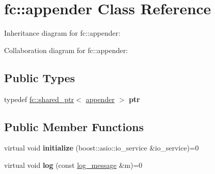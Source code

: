 \hypertarget{classfc_1_1appender}{}\section{fc\+:\+:appender Class Reference}
\label{classfc_1_1appender}


Inheritance diagram for fc\+:\+:appender\+:


Collaboration diagram for fc\+:\+:appender\+:
\subsection*{Public Types}
\begin{DoxyCompactItemize}
\item 
\mbox{\label{classfc_1_1appender_ad365cd5c08b3c5d4f304ed6302d3e954}} 
typedef \mbox{\hyperlink{classfc_1_1shared__ptr}{fc\+::shared\+\_\+ptr}}$<$ \mbox{\hyperlink{classfc_1_1appender}{appender}} $>$ {\bfseries ptr}
\end{DoxyCompactItemize}
\subsection*{Public Member Functions}
\begin{DoxyCompactItemize}
\item 
\mbox{\label{classfc_1_1appender_ae86b4e5cfde6548556295692ba2badca}} 
virtual void {\bfseries initialize} (boost\+::asio\+::io\+\_\+service \&io\+\_\+service)=0
\item 
\mbox{\label{classfc_1_1appender_a2c7c23788e18c882ced73b8a6f24e3c9}} 
virtual void {\bfseries log} (const \mbox{\hyperlink{classfc_1_1log__message}{log\+\_\+message}} \&m)=0
\end{DoxyCompactItemize}
